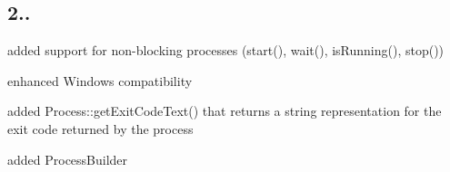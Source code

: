 \subsection*{2.. }


\begin{DoxyItemize}
\item added support for non-\/blocking processes (start(), wait(), is\+Running(), stop())
\item enhanced Windows compatibility
\item added Process\+::get\+Exit\+Code\+Text() that returns a string representation for the exit code returned by the process
\item added Process\+Builder 
\end{DoxyItemize}